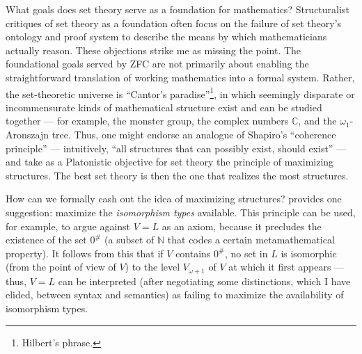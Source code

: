 \documentclass[letterpaper,12pt]{article}
\newcommand{\N}{\mathbb{N}}
\begin{document}
What goals does set theory serve as a foundation for mathematics? Structuralist critiques of set theory as a foundation often focus on the failure of set theory's ontology and proof system to describe the means by which mathematicians actually reason. These objections strike me as missing the point. The foundational goals served by ZFC are not primarily about enabling the straightforward translation of working mathematics into a formal system. Rather, the set-theoretic universe is ``Cantor's paradise''\footnote{Hilbert's phrase.}, in which seemingly disparate or incommensurate kinds of mathematical structure exist and can be studied together --- for example, the monster group, the complex numbers $\mathbb{C}$, and the $\omega_1$-Aronszajn tree. Thus, one might endorse an analogue of Shapiro's \citeyearpar{shapiro1997philosophy} ``coherence principle'' --- intuitively, ``all structures that can possibly exist, should exist'' --- and take as a Platonistic objective for set theory the principle of maximizing structures. The best set theory is then the one that realizes the most structures.

How can we formally cash out the idea of maximizing structures? \cite{maddyvlmaximize} provides one suggestion: maximize the \emph{isomorphism types} available. This principle can be used, for example, to argue against $V = L$ as an axiom, because it precludes the existence of the set $0^\#$ (a subset of $\N$ that codes a certain metamathematical property). It follows from this that if $V$ contains $0^\#$, no set in $L$ is isomorphic (from the point of view of $V$) to the level $V_{\omega+1}$ of $V$ at which it first appears --- thus, $V=L$ can be interpreted (after negotiating some distinctions, which I have elided, between syntax and semantics) as failing to maximize the availability of isomorphism types.
\end{document}
